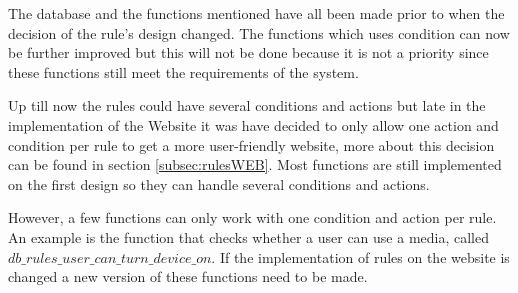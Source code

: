 The database and the functions mentioned have all been made prior to when the decision of the rule's design changed. The functions which uses condition can now be further improved but this will not be done because it is not a priority since these functions still meet the requirements of the system.

Up till now the rules could have several conditions and actions but late in the implementation of the Website it was have decided to only allow one action and condition per rule to get a more user-friendly website, more about this decision can be found in section \vref{subsec:rulesWEB}. Most functions are still implemented on the first design so they can handle several conditions and actions. 

However, a few functions can only work with one condition and action per rule. An example is the function that checks whether a user can use a media, called $db\_rules\_user\_can\_turn\_device\_on$. If the implementation of rules on the website is changed a new version of these functions need to be made.
